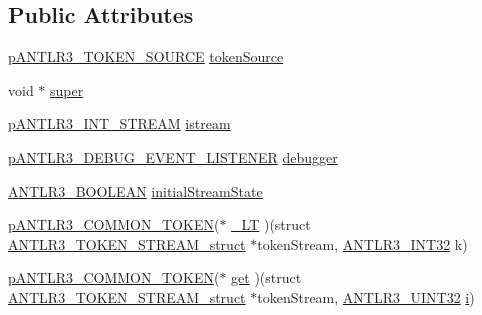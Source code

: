 \subsection*{Public Attributes}
\begin{DoxyCompactItemize}
\item 
\hyperlink{antlr3interfaces_8h_a4b8bc42f86b752cba4de49f0d1f53cba}{p\-A\-N\-T\-L\-R3\-\_\-\-T\-O\-K\-E\-N\-\_\-\-S\-O\-U\-R\-C\-E} \hyperlink{struct_a_n_t_l_r3___t_o_k_e_n___s_t_r_e_a_m__struct_aa8a928aa966f26d92e8c25e0e369d319}{token\-Source}
\item 
void $\ast$ \hyperlink{struct_a_n_t_l_r3___t_o_k_e_n___s_t_r_e_a_m__struct_a2da57a078b0dc782d15ffd0b94469729}{super}
\item 
\hyperlink{antlr3interfaces_8h_af34d949f6aa442e8e7770e420977d338}{p\-A\-N\-T\-L\-R3\-\_\-\-I\-N\-T\-\_\-\-S\-T\-R\-E\-A\-M} \hyperlink{struct_a_n_t_l_r3___t_o_k_e_n___s_t_r_e_a_m__struct_ad380e088966f96866d8d35cf5f03b935}{istream}
\item 
\hyperlink{antlr3interfaces_8h_ab226a624395fcc0b8fe2b29ae60b6116}{p\-A\-N\-T\-L\-R3\-\_\-\-D\-E\-B\-U\-G\-\_\-\-E\-V\-E\-N\-T\-\_\-\-L\-I\-S\-T\-E\-N\-E\-R} \hyperlink{struct_a_n_t_l_r3___t_o_k_e_n___s_t_r_e_a_m__struct_ad1c4befd9be9830fbe87993c4b944f0d}{debugger}
\item 
\hyperlink{antlr3defs_8h_a5b33dccbba3b7212539695e21df4079b}{A\-N\-T\-L\-R3\-\_\-\-B\-O\-O\-L\-E\-A\-N} \hyperlink{struct_a_n_t_l_r3___t_o_k_e_n___s_t_r_e_a_m__struct_a35ccd790082224719a528653cd9d57fa}{initial\-Stream\-State}
\item 
\hyperlink{antlr3interfaces_8h_adaa6df9cbf0cd7ab37fd545520ff299b}{p\-A\-N\-T\-L\-R3\-\_\-\-C\-O\-M\-M\-O\-N\-\_\-\-T\-O\-K\-E\-N}($\ast$ \hyperlink{struct_a_n_t_l_r3___t_o_k_e_n___s_t_r_e_a_m__struct_ab0aa60f67331ab45398ff1f5aa5e4e98}{\-\_\-\-L\-T} )(struct \hyperlink{struct_a_n_t_l_r3___t_o_k_e_n___s_t_r_e_a_m__struct}{A\-N\-T\-L\-R3\-\_\-\-T\-O\-K\-E\-N\-\_\-\-S\-T\-R\-E\-A\-M\-\_\-struct} $\ast$token\-Stream, \hyperlink{antlr3defs_8h_a6faef5c4687f8eb633d2aefea93973ca}{A\-N\-T\-L\-R3\-\_\-\-I\-N\-T32} k)
\item 
\hyperlink{antlr3interfaces_8h_adaa6df9cbf0cd7ab37fd545520ff299b}{p\-A\-N\-T\-L\-R3\-\_\-\-C\-O\-M\-M\-O\-N\-\_\-\-T\-O\-K\-E\-N}($\ast$ \hyperlink{struct_a_n_t_l_r3___t_o_k_e_n___s_t_r_e_a_m__struct_af2a69586f103be83f42bd802c2a80c28}{get} )(struct \hyperlink{struct_a_n_t_l_r3___t_o_k_e_n___s_t_r_e_a_m__struct}{A\-N\-T\-L\-R3\-\_\-\-T\-O\-K\-E\-N\-\_\-\-S\-T\-R\-E\-A\-M\-\_\-struct} $\ast$token\-Stream, \hyperlink{antlr3defs_8h_ac41f744abd0fd25144b9eb9d11b1dfd1}{A\-N\-T\-L\-R3\-\_\-\-U\-I\-N\-T32} \hyperlink{_read_d_m3___matlab_8m_a6f6ccfcf58b31cb6412107d9d5281426}{i})

\end{DoxyCompactItemize}
